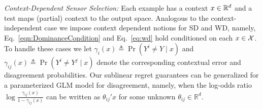\noindent
{\it Context-Dependent Sensor Selection:}
Each example has a context $x \in \mathbb{R}^d$ and a test maps (partial) context to the output space. Analogous to the context-independent case we impose context dependent notions for SD and WD, namely, Eq.~\ref{eqn:DominanceCondition} and Eq.~\ref{eq:wd} hold conditioned on each $x \in {\cal X}$. To handle these cases we let $\gamma_i(x)\triangleq \Pr(Y^{i} \neq Y\mid x)$ and $\gamma_{ij}(x) \triangleq \Pr(Y^{i} \neq Y^{j}\mid x)$ denote the corresponding contextual error and disagreement probabilities. Our sublinear regret guarantees can be generalized for a parameterized GLM model for disagreement, namely, when the log-odds ratio $\log \frac{\gamma_{ij}(x)}{1-\gamma_{ij}(x)}$ can be written as $\theta_{ij}'x$ for some unknown $\theta_{ij} \in \mathbb{R}^d$.
\vspace{-5pt}

